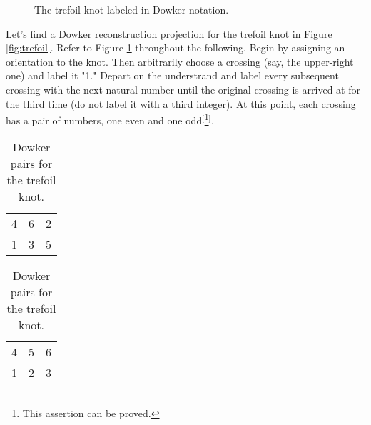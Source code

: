 \documentclass[titlepage,11pt]{article}
\begin{document}
\begin{figure}[h!]
    \centering
    \vspace{-2.3em}
    \caption{The trefoil knot labeled in Dowker notation.}
    \label{fig:trefoilDowker}
\end{figure}

Let's find a Dowker reconstruction projection for the trefoil knot in Figure \ref{fig:trefoil}. Refer to Figure \ref{fig:trefoilDowker} throughout the following. Begin by assigning an orientation to the knot. Then arbitrarily choose a crossing (say, the upper-right one) and label it "1." Depart on the understrand and label every subsequent crossing with the next natural number until the original crossing is arrived at for the third time (do not label it with a third integer). At this point, each crossing has a pair of numbers, one even and one odd$^[$\footnote{This assertion can be proved.}$^]$.\par

\begin{table}[h!]
    \centering
    \begin{subtable}[b]{0.3\linewidth}
        \centering
        \begin{tabular}{ccc}
            4 & 6 & 2\\
            1 & 3 & 5
        \end{tabular}
        \caption{Dowker pairing.}
        \label{tab:trefoilDowkera}
    \end{subtable}
    \begin{subtable}[b]{0.3\linewidth}
        \centering
        \begin{tabular}{ccc}
            4 & 5 & 6\\
            1 & 2 & 3
        \end{tabular}
        \caption{Reconstruction pairing.}
        \label{tab:trefoilDowkerb}
    \end{subtable}
    \caption{Dowker pairs for the trefoil knot.}
    \label{tab:trefoilDowker}
\end{table}
\end{document}
